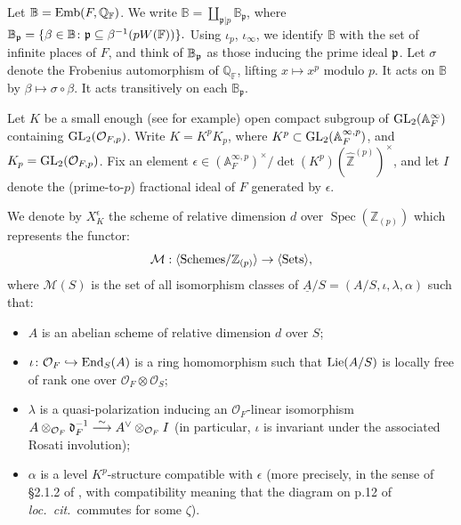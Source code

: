 \documentclass[11pt,pdflatex]{amsart}
\theoremstyle{plain}
\theoremstyle{definition}
\newcommand{\FF}{\mathbf{F}}
\newcommand{\ZZ}{\mathbf{Z}}
\newcommand{\CO}{\mathcal{O}}
\theoremstyle{plain}
\theoremstyle{definition}
\theoremstyle{remark}
\numberwithin{equation}{section}
\numberwithin{figure}{section} \numberwithin{table}{subsection}
\newcommand{\Spec}{{\operatorname{Spec }}}
\newcommand{\gerd}{{\frak{d}}}
\newcommand{\gerp}{{\frak{p}}}
\newcommand{\calO}{{\mathcal{O}}}
\def\AA{\mathbb{A}}
\def\BB{\mathbb{B}}
\def\FF{\mathbb{F}}
\def\ZZ{\mathbb{Z}}
\newcommand{\ra}{{\; \rightarrow \;}}
\begin{document}
Let $\BB={\rm Emb}(F,\mathbb{Q}_\FF)$.  We write $\BB=\textstyle\coprod_{\mathfrak{p}|p}
\mathbb{B}_\mathfrak{p}$, where 
$
\mathbb{B}_\mathfrak{p}= \{\beta\in\mathbb{B}\colon
\gerp \subseteq \beta^{-1}(pW(\FF))\}.
$
 Using $\iota_p$, $\iota_\infty$, we identify  $\BB$ with the set of infinite places of $F$, and think of $\BB_\gerp$ as those inducing the prime ideal $\gerp$. Let $\sigma$ denote the Frobenius automorphism of $\mathbb{Q}_\FF$, lifting $x \mapsto
x^p$ modulo $p$. It acts on $\BB$ by $\beta \mapsto \sigma
\circ \beta$. It acts transitively on each $\BB_\mathfrak{p}$. 


Let $K$ be a small enough (see \cite[Lemma~2.4.1]{DS} for example) open compact subgroup of ${\rm GL}_2(\AA_F^{\infty})$ containing ${\rm GL}_2(\calO_{F,p})$. Write $K=K^pK_p$, where $K^p \subset {\rm GL}_2(\AA_F^{\infty, p})$, and $K_p={\rm GL}_2(\calO_{F,p})$. Fix an element $\epsilon \in (\AA_F^{\infty,p})^\times/\det(K^p)(\widehat{\ZZ}^{(p)})^\times$, and let $I$ denote the (prime-to-$p$) fractional ideal of $F$ generated by $\epsilon$.

We denote by $X_K^\epsilon$ the scheme of relative dimension $d$ over $\Spec(\ZZ_{(p)})$ which represents the functor:
\[
 \mathcal{M}: \langle{\rm Schemes}/\ZZ_{(p)} \rangle \ra \langle{\rm Sets}\rangle,
 \] where $\mathcal{M}(S)$ is the set of all isomorphism classes of  $\underline{A}/S=(A/S,\iota,\lambda,\alpha)$ such that:  
 \begin{itemize}
 \item $A$ is an abelian scheme of relative dimension $d$ over  $S$;
\item $\iota\colon\mathcal{O}_F \hookrightarrow {\rm End}_S(A)$ is a ring
homomorphism such that ${\rm Lie}(A/S)$ is locally free of rank one over $\calO_F \otimes \calO_S$;
 \item  $\lambda$ is a quasi-polarization inducing an $\CO_F$-linear isomorphism $A\otimes_{\CO_F} \gerd_F^{-1} \stackrel{\sim}{\longrightarrow} A^{\vee} \otimes_{\CO_F} I$ (in particular, $\iota$ is invariant under the associated Rosati involution);
 \item  $\alpha$ is a level $K^p$-structure compatible with $\epsilon$ (more precisely, in the sense of \S2.1.2 of \cite{DKS}, with compatibility meaning that the diagram on p.12 of {\em loc.~cit.}~commutes for some $\zeta$).
\end{itemize}
\end{document}
